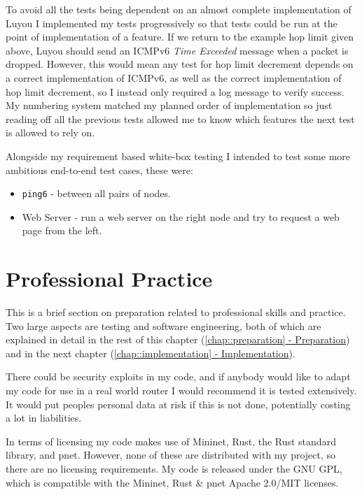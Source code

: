 \documentclass[12pt,a4paper,twoside,openany]{report}
\begin{document}
\bigskip

To avoid all the tests being dependent on an almost complete implementation of Luyou I implemented my tests progressively so that tests could be run at the point of implementation of a feature. If we return to the example hop limit given above, Luyou should send an ICMPv6 \textit{Time Exceeded} message when a packet is dropped.  However, this would mean any test for hop limit decrement depends on a correct implementation of ICMPv6, as well as the correct implementation of hop limit decrement, so I instead only required a log message to verify success.  My numbering system matched my planned order of implementation so just reading off all the previous tests allowed me to know which features the next test is allowed to rely on.  

\bigskip

Alongside my requirement based white-box testing I intended to test some more ambitious end-to-end test cases, these were:
\begin{itemize}
\item \verb!ping6! - between all pairs of nodes.
\item Web Server - run a web server on the right node and try to request a web page from the left.
\end{itemize}

\section{Professional Practice}
This is a brief section on preparation related to professional skills and practice.  Two large aspects are testing and software engineering, both of which are explained in detail in the rest of this chapter (\ref{chap::preparation}\hyperref[chap::preparation]{ - Preparation}) and in the next chapter (\ref{chap::implementation}\hyperref[chap::implementation]{ - Implementation}).  

\bigskip

There could be security exploits in my code, and if anybody would like to adapt my code for use in a real world router I would recommend it is tested extensively.  It would put peoples personal data at risk if this is not done, potentially costing a lot in liabilities.

\bigskip

In terms of licensing my code makes use of Mininet, Rust, the Rust standard library, and pnet.  However, none of these are distributed with my project, so there are no licensing requirements. My code is released under the GNU GPL\cite{gpl}, which is compatible with the Mininet, Rust \& pnet Apache 2.0/MIT licenses.
\end{document}
